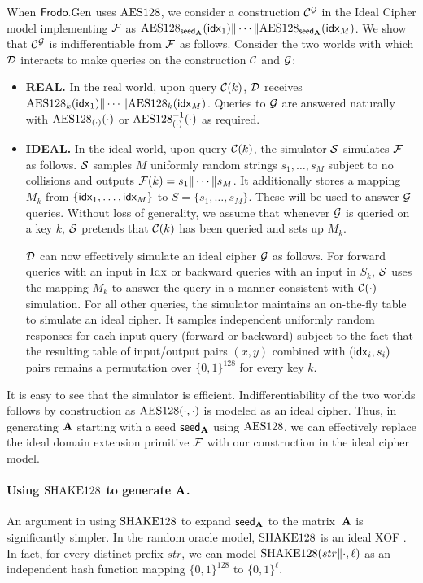 When $\textsf{\upshape\mdseries Frodo}.\textrm{\upshape\mdseries Gen}$ uses $\textrm{\upshape\mdseries AES128}$, we consider a construction
$\mathcal{C}^{\mathcal{G}}$
in the Ideal Cipher model implementing $\mathcal{F}$ as $\textrm{\upshape\mdseries AES128}_{{\mathsf{seed}_{\mathbf{A}}}}(\mathsf{idx}_1) \| \cdots \| \textrm{\upshape\mdseries AES128}_{{\mathsf{seed}_{\mathbf{A}}}}(\mathsf{idx}_M)$. We show that
$\mathcal{C}^{\mathcal{G}}$ is indifferentiable from $\mathcal{F}$ as follows. Consider the two
worlds with which $\mathcal{D}$ interacts to make queries on the construction
$\mathcal{C}$ and $\mathcal{G}$:
\begin{itemize}
	\item \textbf{REAL.} In the real world, upon query $\mathcal{C}(k)$, $\mathcal{D}$
	receives $\textrm{\upshape\mdseries AES128}_k(\mathsf{idx}_1) \| \cdots \| \textrm{\upshape\mdseries AES128}_k(\mathsf{idx}_M)$. 
      Queries to $\mathcal{G}$ are answered naturally with
	$\textrm{\upshape\mdseries AES128}_{(\cdot)}(\cdot)$ or $\textrm{\upshape\mdseries AES128}^{-1}_{(\cdot)}(\cdot)$ as
	required.
	\item \textbf{IDEAL.} In the ideal world, upon query $\mathcal{C}(k)$, the
	simulator $\mathcal{S}$ simulates $\mathcal{F}$ as follows. $\mathcal{S}$ samples $M$
	uniformly random strings $s_1, \ldots, s_M$ subject to no collisions and outputs
	$\mathcal{F}(k) = s_1 \| \cdots \| s_M$. It additionally stores a mapping $M_k$
	from $\{\mathsf{idx}_1, \ldots, \mathsf{idx}_M\}$ to $S = \{s_1, \ldots, s_M\}$. These
	will be used to answer $\mathcal{G}$ queries. Without loss of generality, we
	assume that whenever $\mathcal{G}$ is queried on a key $k$, $\mathcal{S}$ pretends
	that $\mathcal{C}(k)$ has been queried and sets up $M_k$.
	
	$\mathcal{D}$ can now effectively simulate an ideal cipher $\mathcal{G}$ as follows.
	For forward queries with an input in $\mathrm{Idx}$ or backward queries with
	an input in $S_k$, $\mathcal{S}$ uses the mapping $M_k$ to answer the query in a
	manner consistent with $\mathcal{C}(\cdot)$ simulation. For all other queries, the simulator maintains an
	on-the-fly table to simulate an ideal cipher. It samples independent
	uniformly random responses for each input query (forward or backward) subject to
	the fact that the resulting table of input/output pairs $(x, y)$ combined
	with $(\mathsf{idx}_i, s_i)$ pairs remains a permutation
	over $\{0, 1\}^{128}$ for every key $k$.
\end{itemize}

It is easy to see that the simulator is efficient. Indifferentiability of the
two worlds follows by construction as $\textrm{\upshape\mdseries AES128}(\cdot, \cdot)$ is
modeled as an ideal cipher. Thus, in generating $\mathbf{A}$ starting with a seed
${\mathsf{seed}_{\mathbf{A}}}$ using $\textrm{\upshape\mdseries AES128}$, we can effectively replace the ideal
domain extension primitive $\mathcal{F}$ with our construction in the ideal cipher
model.

\paragraph{Using $\textrm{\upshape\mdseries SHAKE}128$ to generate $\mathbf{A}$.} An argument in using
$\textrm{\upshape\mdseries SHAKE}128$ to expand ${\mathsf{seed}_{\mathbf{A}}}$ to the matrix~$\mathbf{A}$ is significantly
simpler. In the random oracle model, $\textrm{\upshape\mdseries SHAKE}128$ is an ideal XOF
\cite{dworkin2015sha}. In fact, for every distinct prefix $str$, we can
model $\textrm{\upshape\mdseries SHAKE}128(str \| \cdot, \ell)$ as an independent hash function mapping
$\{0, 1\}^{128}$ to $\{0, 1\}^\ell$. 

